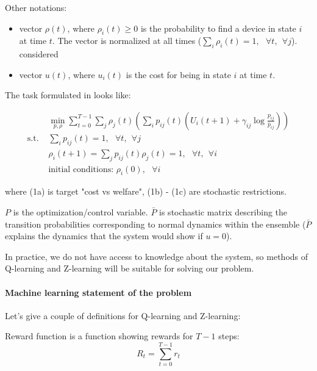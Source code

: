\documentclass[12pt,twoside]{article}
\begin{document}
    Other notations:
    \begin{itemize}
        \item vector $\rho (t)$, where $\rho_i (t) \geq 0$  is the probability to find a device in state $i$ at time $t$. The vector is normalized at all times ($\sum\limits_{i}\rho_{i}(t) = 1,~~~\forall t, ~~\forall j$).
considered

        \item vector $u (t)$, where $u_i(t)$ is the cost for being in state $i$ at time $t$.
    \end{itemize}


The task formulated in \cite{Chertkov} looks like:

\begin{subequations}
\begin{align}
    & \min\limits_{p, \rho} \sum\limits_{t = 0}^{T-1} \sum\limits_{j} \rho_{j}(t)\left(\sum\limits_{i}p_{ij}(t)\left(  U_{i}(t+1) + \gamma_{ij} \log\frac{p_{ij}}{\bar p_{ij}}\right)\right) \\
\text {s.t. } & \sum\limits_{i}p_{ij}(t) = 1,~~~\forall t, ~~\forall j \\
& \rho_{i}(t+1) = \sum\limits_{j}p_{ij}(t)\rho_{j}(t) = 1,~~~\forall t, ~~\forall i\\
&\text{initial conditions: } \rho_{i}(0), ~~~\forall i
\end{align}
\end{subequations}

where (1a) is target "cost vs welfare"{}, (1b) - (1c) are stochastic restrictions. 

$P$ is the optimization/control variable. $\bar P$ is stochastic matrix
describing  the  transition  probabilities  corresponding  to  normal  dynamics within the ensemble ($\bar P$ explains the dynamics that the system would show if $u = 0$).

In practice, we do not have access to knowledge about the system, so methods of Q-learning and Z-learning will be suitable for solving our problem.

\paragraph{Machine learning statement of the problem}

Let's give a couple of definitions for Q-learning and Z-learning:

\begin{Def}
Reward function is a function showing rewards for $T-1$ steps:
\begin{equation}
R_t = \sum\limits_{t=0}^{T-1} r_t
\end{equation}

\end{Def}
\end{document}
